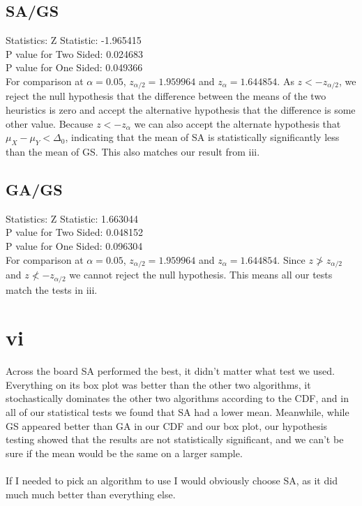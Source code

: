 \documentclass[12pt]{article}
\begin{document}
\subsection{SA/GS}
Statistics: Z Statistic: -1.965415\\
P value for Two Sided: 0.024683\\
P value for One Sided: 0.049366\\

For comparison at $\alpha = 0.05$, $z_{\alpha/2}=1.959964$ and $z_{\alpha}=1.644854$.  As $z < -z_{\alpha/2}$, we reject the null hypothesis that the difference between the means of the two heuristics is zero and accept the alternative hypothesis that the difference is some other value.  Because $z<-z_\alpha$ we can also accept the alternate hypothesis that $\mu_X - \mu_Y < \Delta_0$, indicating that the mean of SA is statistically significantly less than the mean of GS.  This also matches our result from iii.


\subsection{GA/GS}
Statistics: Z Statistic: 1.663044\\
P value for Two Sided: 0.048152\\
P value for One Sided: 0.096304\\

For comparison at $\alpha = 0.05$, $z_{\alpha/2}=1.959964$ and $z_{\alpha}=1.644854$.  Since $z \ngtr z_{\alpha/2}$ and $z \nless -z_{\alpha/2}$ we cannot reject the null hypothesis.  This means all our tests match the tests in iii.

\section{vi}
Across the board SA performed the best, it didn't matter what test we used.  Everything on its box plot was better than the other two algorithms, it stochastically dominates the other two algorithms according to the CDF, and in all of our statistical tests we found that SA had a lower mean.  Meanwhile, while GS appeared better than GA in our CDF and our box plot, our hypothesis testing showed that the results are not statistically significant, and we can't be sure if the mean would be the same on a larger sample.\\\\
If I needed to pick an algorithm to use I would obviously choose SA, as it did much much better than everything else.
\end{document}
